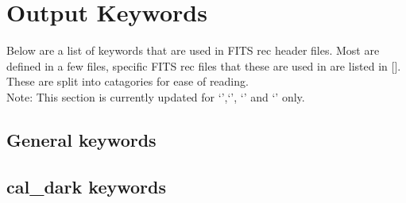 \section{Output Keywords}
\label{section:the_out_keywords}





Below are a list of keywords that are used in FITS rec header files. Most are
defined in a few files, specific FITS rec files that these are used in are listed in []. These are split into catagories for ease of reading. \\

\noindent Note: This section is currently updated for `\caldark',`\calloc', `\calslit' and `\calff' only.


\vspace{0.5cm}
\subsection{General keywords}






\vspace{0.5cm}
\subsection{cal\_dark keywords}


